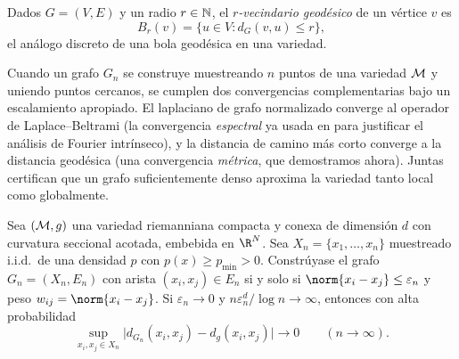 \begin{definition}
\label{def:geo:graph-ball}
Dados $G = (V, E)$ y un radio $r \in \mathbb{N}$, el \emph{$r$-vecindario geod\'esico} de
un v\'ertice $v$ es
\[
  B_r(v) = \{ u \in V : d_G(v, u) \le r\},
\]
el an\'alogo discreto de una bola geod\'esica en una variedad.
\end{definition}

Cuando un grafo $G_n$ se construye muestreando $n$ puntos de una variedad $\mathcal{M}$ y
uniendo puntos cercanos, se cumplen dos convergencias complementarias bajo un
escalamiento apropiado. El laplaciano de grafo normalizado converge al operador
de Laplace--Beltrami (la convergencia \emph{espectral} ya usada en
 para justificar el an\'alisis de Fourier intr\'inseco), y la
distancia de camino m\'as corto converge a la distancia geod\'esica (una
convergencia \emph{m\'etrica}, que demostramos ahora). Juntas certifican que un
grafo suficientemente denso aproxima la variedad tanto local como globalmente.

\begin{theorem}
\label{thm:geo:graph-convergence}
Sea $(\mathcal{M}, g)$ una variedad riemanniana compacta y conexa de dimensi\'on $d$ con
curvatura seccional acotada, embebida en $\R^N$. Sea
$X_n = \{x_1, \dots, x_n\}$ muestreado i.i.d.\ de una densidad $p$ con
$p(x) \ge p_{\min} > 0$. Constr\'uyase el grafo $G_n = (X_n, E_n)$ con arista
$(x_i,x_j) \in E_n$ si y solo si $\norm{x_i - x_j} \le \varepsilon_n$ y peso
$w_{ij} = \norm{x_i - x_j}$. Si $\varepsilon_n \to 0$ y
$n\varepsilon_n^d / \log n \to \infty$, entonces con alta probabilidad
\[
  \sup_{x_i, x_j \in X_n}
    \big| d_{G_n}(x_i, x_j) - d_g(x_i, x_j)\big| \to 0
  \qquad (n \to \infty).
\]
\end{theorem}

